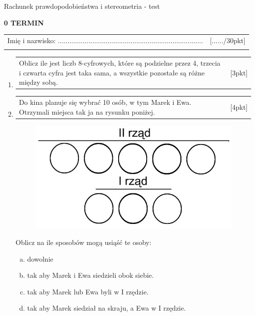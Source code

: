 \documentclass[12pt,a4paper]{article}
\begin{document}
	\begin{center}
		\LARGE Rachunek prawdopodobieństwa i stereometria - test
	\end{center}
	\vspace{1.5cm}
	\begin{flushright}
		\textbf{0 TERMIN}
	\end{flushright}
	\begin{tabular}{p{13cm} r}
		Imię i nazwisko: ............................................................................
		&[....../30pkt]\\ 
		\vspace{0.5cm}
	\end{tabular}
	\begin{enumerate}[1.]
		\item  \begin{tabular}{p{13cm} r}
			Oblicz ile jest liczb  8-cyfrowych, które są podzielne przez 4, trzecia i czwarta cyfra jest taka sama, a wszystkie pozostałe są różne między sobą.&[3pkt]\\ 
		\end{tabular}
	
		\item  \begin{tabular}{p{13cm} r}
			Do kina planuje się wybrać 10 osób, w tym Marek i Ewa. Otrzymali miejsca tak ja na rysunku poniżej.&[4pkt]\\ 
		\end{tabular}
	
		\begin{figure}[h]
			\centering
			\includegraphics[scale=0.4]{rpst1.jpeg}
		\end{figure}
	
		Oblicz na ile sposobów mogą usiąść te osoby:
		\begin{enumerate}[a)]
			\item dowolnie
			\item tak aby Marek i Ewa siedzieli obok siebie.
			\item tak aby Marek lub Ewa byli w I rzędzie.
			\item tak aby Marek siedział na skraju, a Ewa w I rzędzie.
		\end{enumerate}
	

\end{enumerate}
\end{document}
